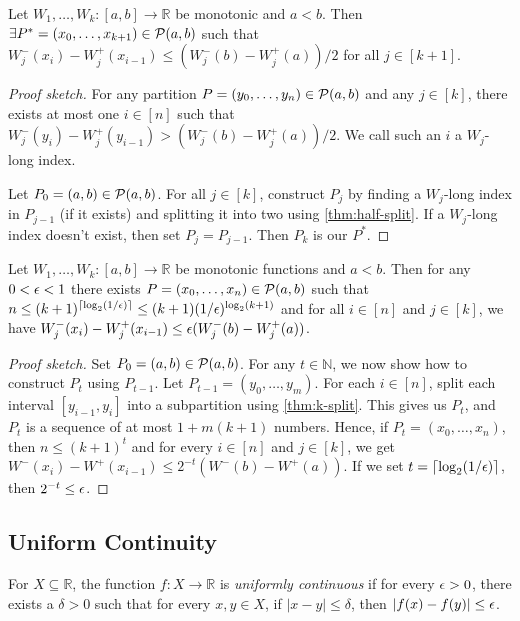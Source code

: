 \documentclass[a4paper,12pt,fleqn]{article}
\begin{document}
\begin{lemma}
\label{thm:k-split}
Let $W_1, \ldots, W_k: [a, b] \to \mathbb{R}$ be monotonic and $a < b$.
Then $\exists P^* = (x_0, \ldots, x_{k+1}) \in \mathcal{P}(a, b)$ such that
$W_j^-(x_i) - W_j^+(x_{i-1}) \le (W_j^-(b) - W_j^+(a))/2$ for all $j \in [k+1]$.
\end{lemma}
\begin{proof}[Proof sketch]
For any partition $P = (y_0, \ldots, y_n) \in \mathcal{P}(a, b)$ and any $j \in [k]$,
there exists at most one $i \in [n]$ such that
$W_j^-(y_i) - W_j^+(y_{i-1}) > (W_j^-(b) - W_j^+(a))/2$.
We call such an $i$ a $W_j$-long index.

Let $P_0 = (a, b) \in \mathcal{P}(a, b)$.
For all $j \in [k]$, construct $P_j$ by finding a $W_j$-long index in $P_{j-1}$
(if it exists) and splitting it into two using \cref{thm:half-split}.
If a $W_j$-long index doesn't exist, then set $P_j = P_{j-1}$.
Then $P_k$ is our $P^*$.
\end{proof}

\begin{lemma}
\label{thm:fine-split}
Let $W_1, \ldots, W_k: [a, b] \to \mathbb{R}$ be monotonic functions and $a < b$.
Then for any $0 < \epsilon < 1$ there exists $P = (x_0, \ldots, x_n) \in \mathcal{P}(a, b)$
such that $n \le (k+1)^{\left\lceil \log_2(1/\epsilon) \right\rceil} \le (k+1)(1/\epsilon)^{\log_2(k+1)}$
and for all $i \in [n]$ and $j \in [k]$, we have
$W_j^-(x_i) - W_j^+(x_{i-1}) \le \epsilon(W_j^-(b) - W_j^+(a))$.
\end{lemma}
\begin{proof}[Proof sketch]
Set $P_0 = (a, b) \in \mathcal{P}(a, b)$. For any $t \in \mathbb{N}$,
we now show how to construct $P_t$ using $P_{t-1}$.
Let $P_{t-1} = (y_0, \ldots, y_m)$. For each $i \in [n]$,
split each interval $[y_{i-1}, y_i]$ into a subpartition using \cref{thm:k-split}.
This gives us $P_t$, and $P_t$ is a sequence of at most $1+m(k+1)$ numbers.
Hence, if $P_t = (x_0, \ldots, x_n)$, then $n \le (k+1)^t$
and for every $i \in [n]$ and $j \in [k]$, we get
$W^-(x_i) - W^+(x_{i-1}) \le 2^{-t}(W^-(b) - W^+(a))$.
If we set $t = \left\lceil \log_2(1/\epsilon) \right\rceil$, then $2^{-t} \le \epsilon$.
\end{proof}

\subsection{Uniform Continuity}

\begin{definition}
\label{defn:unif-cont}
For $X \subseteq \mathbb{R}$, the function $f: X \to \mathbb{R}$
is \emph{uniformly continuous} if
for every $\epsilon > 0$, there exists a $\delta > 0$ such that for every $x, y \in X$,
if $|x-y| \le \delta$, then $|f(x)-f(y)| \le \epsilon$.
\end{definition}
\end{document}
